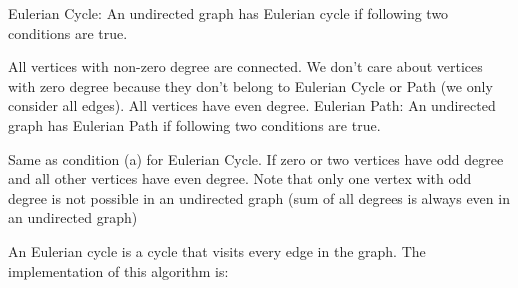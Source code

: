 Eulerian Cycle: An undirected graph has Eulerian cycle if following two conditions are true. 

All vertices with non-zero degree are connected. We don’t care about vertices with zero degree because they don’t belong to Eulerian Cycle or Path (we only consider all edges). 
All vertices have even degree.
Eulerian Path: An undirected graph has Eulerian Path if following two conditions are true. 

Same as condition (a) for Eulerian Cycle.
If zero or two vertices have odd degree and all other vertices have even degree. Note that only one vertex with odd degree is not possible in an undirected graph (sum of all degrees is always even in an undirected graph)

An Eulerian cycle is a cycle that visits every edge in the graph. The implementation of this algorithm is:


